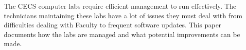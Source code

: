 \thispagestyle{empty}

The CECS computer labs require efficient management to run effectively. The technicians maintaining these labs have a lot of issues they must deal with from difficulties dealing with Faculty to frequent software updates. This paper documents how the labs are managed and what potential improvements can be made. 
